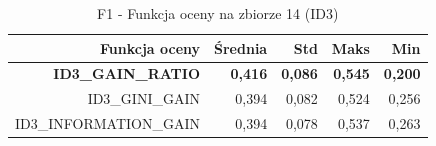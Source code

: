 \begin{table}[htbp]
\centering
\small
\setlength{\tabcolsep}{6pt}
\renewcommand{\arraystretch}{1.2}
\caption{F1 - Funkcja oceny na zbiorze 14 (ID3)}
\label{tab:ID3_eval_function_14_f1}
\begin{tabular}{r|r|r|r|r}
\toprule
Funkcja oceny & Średnia & Std & Maks & Min \\
\hline
\textbf{ID3\_GAIN\_RATIO} & \textbf{0,416} & \textbf{0,086} & \textbf{0,545} & \textbf{0,200} \\
ID3\_GINI\_GAIN & 0,394 & 0,082 & 0,524 & 0,256 \\
ID3\_INFORMATION\_GAIN & 0,394 & 0,078 & 0,537 & 0,263 \\
\bottomrule
\end{tabular}
\end{table}